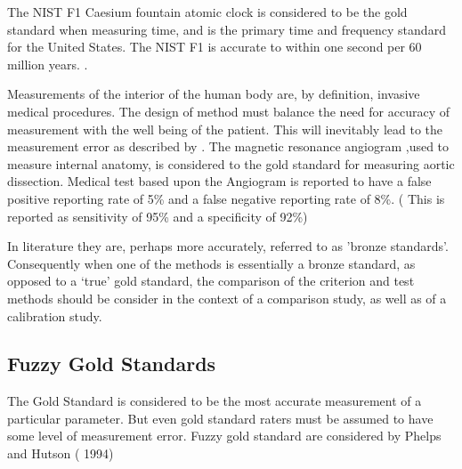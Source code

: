 \documentclass[12pt, a4paper]{article}
\begin{document}
The NIST F1 Caesium fountain atomic clock is considered to be the gold standard when measuring time, and is the primary time and frequency standard for the United States. The NIST F1 is accurate
to within one second per 60 million years. \citep{NIST}.

Measurements of the interior of the human body are, by definition, invasive medical procedures. The design of method must balance the need for accuracy of measurement with the well being of the patient. This will inevitably lead to the measurement error as described by \citet{DunnSEME}. The magnetic resonance angiogram ,used to measure internal anatomy,  is considered to the gold standard for measuring aortic dissection. Medical test based upon the Angiogram is reported to have a false positive reporting rate of 5\% and a false negative reporting rate of 8\%. ( This is
reported as sensitivity of 95\% and a specificity of 92\%)
\citep{ACR}

In literature they are, perhaps more accurately, referred to as
'bronze standards'. Consequently when one of the methods is
essentially a bronze standard, as opposed to a `true' gold
standard, the comparison of the criterion and test methods should
be consider in the context of a comparison study, as well as of a
calibration study.



\subsection{Fuzzy Gold Standards} The Gold Standard is considered to be the most
accurate measurement of a particular parameter. But even gold
standard raters must be assumed to have some level of measurement
error. Fuzzy gold standard are considered by Phelps and Hutson (
1994)

\end{document}
